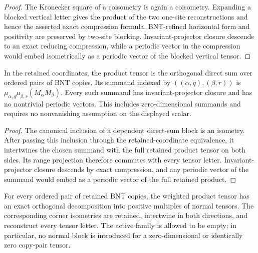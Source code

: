 \begin{proof}\leanok
    The Kronecker square of a coisometry is again a coisometry. Expanding a
    blocked vertical letter gives the product of the two one-site
    reconstructions and hence the asserted exact compression formula.
    BNT-refined horizontal form and positivity are preserved by
    two-site blocking. Invariant-projector closure descends to an exact reducing
    compression, while a periodic vector in the compression would embed
    isometrically as a periodic vector of the blocked vertical tensor.
\end{proof}

\begin{lemma}
    \label{thm:mpdo_weighted_vertical_product_block_canonical_hypotheses}
    \leanok
    In the retained coordinates, the product tensor is the orthogonal direct
    sum over ordered pairs of BNT copies. Its summand indexed by
    $((\alpha,q),(\beta,r))$ is
    $\mu_{\alpha,q}\mu_{\beta,r}(M_\alpha M_\beta)$.
    Every such summand has invariant-projector closure and has no nontrivial
    periodic vectors. This includes zero-dimensional summands and requires
    no nonvanishing assumption on the displayed scalar.
\end{lemma}

\begin{proof}\leanok
    The canonical inclusion of a dependent direct-sum block is an isometry.
    After passing this inclusion through the retained-coordinate
    equivalence, it intertwines the chosen summand with the full retained
    product tensor on both sides. Its range projection therefore commutes
    with every tensor letter. Invariant-projector closure descends by exact
    compression, and any periodic vector of the summand would embed as a
    periodic vector of the full retained product.
\end{proof}

\begin{lemma}
    \label{thm:mpdo_weighted_vertical_product_block_normal_decomposition}
    \leanok
    For every ordered pair of retained BNT copies, the weighted product tensor
    has an exact orthogonal decomposition into positive multiples of normal
    tensors. The corresponding corner isometries are retained, intertwine in
    both directions, and reconstruct every tensor letter. The active family
    is allowed to be empty; in particular, no normal block is introduced for
    a zero-dimensional or identically zero copy-pair tensor.
\end{lemma}

